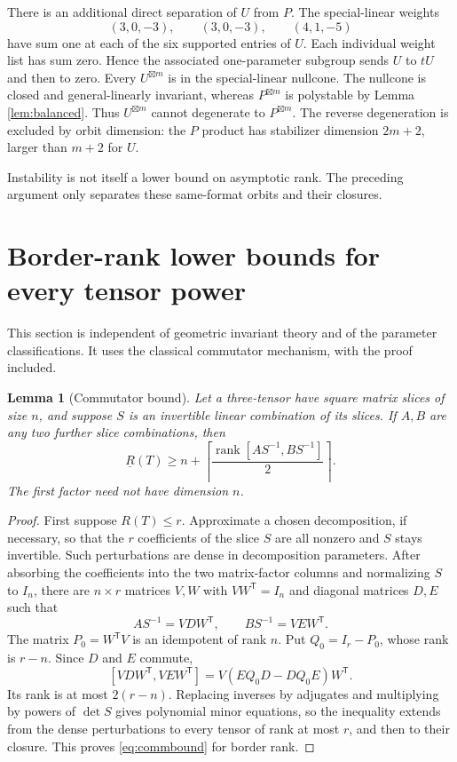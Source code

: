 \documentclass[11pt]{article}
\newtheorem{lemma}[theorem]{Lemma}
\theoremstyle{remark}\newtheorem{remark}[theorem]{Remark}
\newcommand{\rank}{\operatorname{rank}}
\newcommand{\BR}{\underline R}
\newcommand{\gp}{\boxtimes}
\begin{document}
There is an additional direct separation of $U$ from $P$. The special-linear weights
\begin{equation}\label{eq:Uweights}
 (3,0,-3),\qquad(3,0,-3),\qquad(4,1,-5)
\end{equation}
have sum one at each of the six supported entries of $U$. Each individual weight list has sum zero. Hence the associated one-parameter subgroup sends $U$ to $tU$ and then to zero. Every $U^{\gp m}$ is in the special-linear nullcone. The nullcone is closed and general-linearly invariant, whereas $P^{\gp m}$ is polystable by Lemma \ref{lem:balanced}. Thus $U^{\gp m}$ cannot degenerate to $P^{\gp m}$. The reverse degeneration is excluded by orbit dimension: the $P$ product has stabilizer dimension $2m+2$, larger than $m+2$ for $U$.

Instability is not itself a lower bound on asymptotic rank. The preceding argument only separates these same-format orbits and their closures.

\section{Border-rank lower bounds for every tensor power}\label{sec:lower}
This section is independent of geometric invariant theory and of the parameter classifications. It uses the classical commutator mechanism, with the proof included.

\begin{lemma}[Commutator bound]\label{lem:comm}
Let a three-tensor have square matrix slices of size $n$, and suppose $S$ is an invertible linear combination of its slices. If $A,B$ are any two further slice combinations, then
\begin{equation}\label{eq:commbound}
 \BR(T)\geq n+\left\lceil\frac{\rank[AS^{-1},BS^{-1}]}2\right\rceil.
\end{equation}
The first factor need not have dimension $n$.
\end{lemma}
\begin{proof}
First suppose $R(T)\leq r$. Approximate a chosen decomposition, if necessary, so that the $r$ coefficients of the slice $S$ are all nonzero and $S$ stays invertible. Such perturbations are dense in decomposition parameters. After absorbing the coefficients into the two matrix-factor columns and normalizing $S$ to $I_n$, there are $n\times r$ matrices $V,W$ with $VW^{\mathsf T}=I_n$ and diagonal matrices $D,E$ such that
\[
 AS^{-1}=VDW^{\mathsf T},\qquad BS^{-1}=VEW^{\mathsf T}.
\]
The matrix $P_0=W^{\mathsf T}V$ is an idempotent of rank $n$. Put $Q_0=I_r-P_0$, whose rank is $r-n$. Since $D$ and $E$ commute,
\[
 [VDW^{\mathsf T},VEW^{\mathsf T}]
 =V(EQ_0D-DQ_0E)W^{\mathsf T}.
\]
Its rank is at most $2(r-n)$. Replacing inverses by adjugates and multiplying by powers of $\det S$ gives polynomial minor equations, so the inequality extends from the dense perturbations to every tensor of rank at most $r$, and then to their closure. This proves \eqref{eq:commbound} for border rank.
\end{proof}
\end{document}
